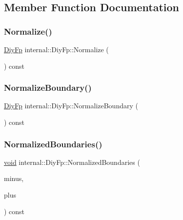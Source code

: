 \subsection{Member Function Documentation}
\mbox{\label{structinternal_1_1DiyFp_aa6cbacc8dfcd92cb8c57884e45548976}} 
\subsubsection{\texorpdfstring{Normalize()}{Normalize()}}
{\footnotesize\ttfamily \hyperlink{structinternal_1_1DiyFp}{Diy\+Fp} internal\+::\+Diy\+Fp\+::\+Normalize (\begin{DoxyParamCaption}{ }\end{DoxyParamCaption}) const\hspace{0.3cm}{\ttfamily [inline]}}

\mbox{\label{structinternal_1_1DiyFp_a3a840e739b412e20e11c05a03f4573df}} 
\subsubsection{\texorpdfstring{Normalize\+Boundary()}{NormalizeBoundary()}}
{\footnotesize\ttfamily \hyperlink{structinternal_1_1DiyFp}{Diy\+Fp} internal\+::\+Diy\+Fp\+::\+Normalize\+Boundary (\begin{DoxyParamCaption}{ }\end{DoxyParamCaption}) const\hspace{0.3cm}{\ttfamily [inline]}}

\mbox{\label{structinternal_1_1DiyFp_adef8bf723f24db9dc6cefa260e8c2390}} 
\subsubsection{\texorpdfstring{Normalized\+Boundaries()}{NormalizedBoundaries()}}
{\footnotesize\ttfamily \hyperlink{imgui__impl__opengl3__loader_8h_ac668e7cffd9e2e9cfee428b9b2f34fa7}{void} internal\+::\+Diy\+Fp\+::\+Normalized\+Boundaries (\begin{DoxyParamCaption}\item[{\hyperlink{structinternal_1_1DiyFp}{Diy\+Fp} $\ast$}]{minus,  }\item[{\hyperlink{structinternal_1_1DiyFp}{Diy\+Fp} $\ast$}]{plus }\end{DoxyParamCaption}) const\hspace{0.3cm}{\ttfamily [inline]}}

